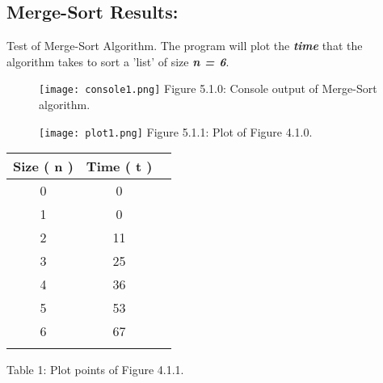 \subsection{Merge-Sort Results:}

Test of Merge-Sort Algorithm. The program will plot the {\bfseries\itshape time} that the algorithm takes to sort a 'list' of size {\bfseries\itshape n = 6}.

\begin{figure}[H]
\texttt{[image: console1.png]}
\centering \linebreak \linebreak Figure 5.1.0: Console output of Merge-Sort algorithm.
\end{figure} 

\begin{multicols}{2}
\begin{figure}[H]
\texttt{[image: plot1.png]}
\centering \linebreak \linebreak Figure 5.1.1: Plot of Figure 4.1.0.
\end{figure} 

\begin{center}
\begin{itemize}
\end{itemize}
{\Large
\begin{tabular}[.5cm]{c c c }
\toprule
Size ( n ) & Time ( t ) \\
\midrule
0 & 0 \\
\cmidrule{1-2}
1 & 0 \\
\cmidrule{1-2}
2 & 11 \\
\cmidrule{1-2}
3 & 25 \\
\cmidrule{1-2}
4 & 36 \\
\cmidrule{1-2}
5 & 53 \\
\cmidrule{1-2}
6 & 67 \\
\bottomrule
\linebreak
\end{tabular}}
\linebreak \linebreak Table 1: Plot points of Figure 4.1.1.
\end{center}
\end{multicols} \hfill

{\bfseries\itshape\color{armygreen}{Observation:}} {\itshape{}}  \hfill \break


